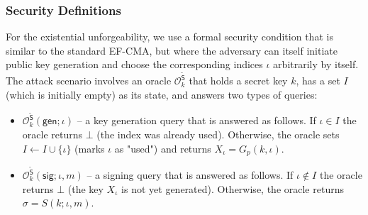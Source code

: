 \documentclass{article}
\begin{document}
\subsubsection{Security Definitions}

For the existential unforgeability, we use a formal security condition that is similar to the standard EF-CMA, but where the adversary can itself initiate public key generation and choose the corresponding indices $\iota$ arbitrarily by itself.
The attack scenario involves an oracle $\mathcal{O}^{\tilde{\mathsf{S}}}_k$ that
holds a secret key $k$, has a set $I$ (which is initially empty) as its state, and answers two types of queries:
\begin{itemize}
\item $\mathcal{O}^{\tilde{\mathsf{S}}}_k(\mathsf{gen};\iota)$ -- a key generation query that is answered as follows. If $\iota\in I$ the  oracle returns $\bot$ (the index was already used). Otherwise, the oracle sets $I\gets I\cup \{\iota\}$ (marks $\iota$ as "used") and returns $X_\iota = G_p(k,\iota)$.
\item $\mathcal{O}^{\tilde{\mathsf{S}}}_k(\mathsf{sig};\iota,m)$ -- a signing query that is answered as follows. If $\iota\not\in I$ the oracle returns $\bot$ (the key $X_\iota$ is not yet generated). Otherwise, the oracle returns $\sigma=S(k;\iota,m)$.
\end{itemize}
\end{document}
